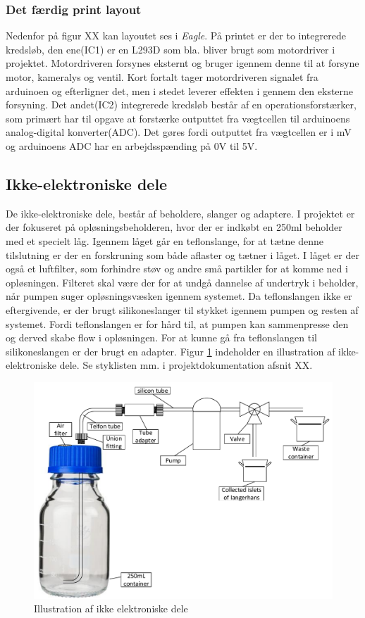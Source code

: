 \subsubsection{Det færdig print layout}
Nedenfor på figur XX kan layoutet ses i \textit{Eagle}. På printet er der to integrerede kredsløb, den ene(IC1) er en L293D som bla. bliver brugt som motordriver i projektet. Motordriveren forsynes eksternt og bruger igennem denne til at forsyne motor, kameralys og ventil. Kort fortalt tager motordriveren signalet fra arduinoen og efterligner det, men i stedet leverer effekten i gennem den eksterne forsyning. Det andet(IC2) integrerede kredsløb består af en operationsforstærker, som primært har til opgave at forstærke outputtet fra vægtcellen til arduinoens analog-digital konverter(ADC). Det gøres fordi outputtet fra vægtcellen er i mV og arduinoens ADC har en arbejdsspænding på 0V til 5V.  

\subsection{Ikke-elektroniske dele}
De ikke-elektroniske dele, består af beholdere, slanger og adaptere. I projektet er der fokuseret på opløsningsbeholderen, hvor der er indkøbt en 250ml beholder med et specielt låg. Igennem låget går en teflonslange, for at tætne denne tilslutning er der en forskruning som både aflaster og tætner i låget. I låget er der også et luftfilter, som forhindre støv og andre små partikler for at komme ned i opløsningen. Filteret skal være der for at undgå dannelse af undertryk i beholder, når pumpen suger opløsningsvæsken igennem systemet. Da teflonslangen ikke er eftergivende, er der brugt silikoneslanger til stykket igennem pumpen og resten af systemet. Fordi teflonslangen er for hård til, at pumpen kan sammenpresse den og derved skabe flow i opløsningen. For at kunne gå fra teflonslangen til silikoneslangen er der brugt en adapter. Figur \ref{fig:nonelectronic} indeholder en illustration af ikke-elektroniske dele. Se styklisten mm. i projektdokumentation afsnit XX.
\begin{figure}[H]
	\centering
	\includegraphics[width=1\textwidth]{billeder/Hovedrapport/ikkeelektronisk.pdf}
	\caption{Illustration af ikke elektroniske dele}
	\label{fig:nonelectronic}
\end{figure}

